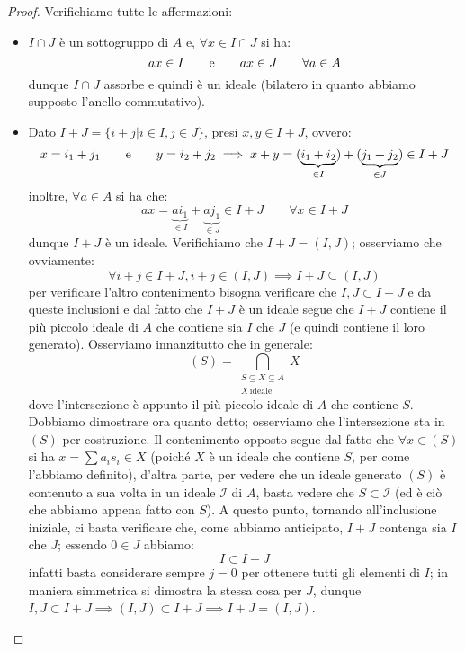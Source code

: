 \documentclass[11pt]{scrartcl}
\begin{document}
\begin{proof}
    Verifichiamo tutte le affermazioni:
    \begin{itemize}
        \item $I \cap J$ è un sottogruppo di $A$ e, $\forall x \in I \cap J$ si ha:
            \[ ax \in I \qquad \text e \qquad ax \in J \qquad \forall a \in A
                \]
            dunque $I \cap J$ assorbe e quindi è un ideale (bilatero in quanto abbiamo supposto l'anello commutativo).
        \item Dato $I + J = \{i + j | i \in I, j \in J\}$, presi $x,y \in I + J$, ovvero:
            \[ x = i_1 + j_1 \qquad \text e \qquad y = i_2 + j_2 \implies x + y = (\underbrace{i_1 + i_2}_{\in I}) + (\underbrace{j_1 + j_2}_{\in J}) \in I + J
                \]
            inoltre, $\forall a \in A$ si ha che:
            \[ ax = \underbrace{ai_1}_{\in I} + \underbrace{aj_1}_{\in J} \in I + J \qquad \forall x \in I + J
                \]
            dunque $I+J$ è un ideale. Verifichiamo che $I+J = (I,J)$; osserviamo che ovviamente:
            \[ \forall i+j \in I+J, i+j \in (I,J) \implies I + J \subseteq (I,J)
                \]
            per verificare l'altro contenimento bisogna verificare che $I,J \subset I + J$ e da queste inclusioni e dal fatto che $I + J$ è un ideale segue che
            $I + J$ contiene il più piccolo ideale di $A$ che contiene sia $I$ che $J$ (e quindi contiene il loro generato). Osserviamo innanzitutto che in generale:
                \[ (S) = \bigcap_{\substack{S \subseteq X \subseteq A\\ X\,\text{ideale}}} X
                    \]
            dove l'intersezione è appunto il più piccolo ideale di $A$ che contiene $S$.
            Dobbiamo dimostrare ora quanto detto; osserviamo che l'intersezione sta in $(S)$ per costruzione.
            Il contenimento opposto segue dal fatto che $\forall x \in (S)$ si ha $x = \sum a_is_i \in X$ (poiché $X$ è un ideale che contiene $S$, per come l'abbiamo definito),
            d'altra parte, per vedere che un ideale generato $(S)$ è contenuto a sua volta in un ideale $\mathcal{I}$ di $A$, basta vedere che $S \subset \mathcal{I}$ (ed è ciò che abbiamo appena fatto con $S$).
            A questo punto, tornando all'inclusione iniziale, ci basta verificare che, come abbiamo anticipato, $I+J$ contenga sia $I$ che $J$; essendo $0 \in J$ abbiamo:
                \[ I \subset I + J
                    \]
            infatti basta considerare sempre $j = 0$ per ottenere tutti gli elementi di $I$; in maniera simmetrica si dimostra la stessa cosa per $J$, dunque $I,J \subset I + J \implies (I,J) \subset I + J \implies I + J = (I,J)$.

\end{itemize}
\end{proof}
\end{document}
